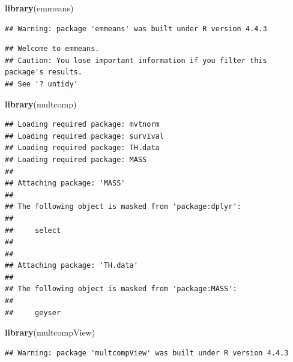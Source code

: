 \documentclass[
]{article}
\newenvironment{Shaded}{\begin{snugshade}}{\end{snugshade}}
\newcommand{\FunctionTok}[1]{\textcolor[rgb]{0.13,0.29,0.53}{\textbf{#1}}}
\newcommand{\NormalTok}[1]{#1}
\newcommand{\OtherTok}[1]{\textcolor[rgb]{0.56,0.35,0.01}{#1}}
\newcommand{\SpecialCharTok}[1]{\textcolor[rgb]{0.81,0.36,0.00}{\textbf{#1}}}
\begin{document}
\begin{Shaded}
\begin{Highlighting}[]
\FunctionTok{library}\NormalTok{(emmeans)}
\end{Highlighting}
\end{Shaded}

\begin{verbatim}
## Warning: package 'emmeans' was built under R version 4.4.3
\end{verbatim}

\begin{verbatim}
## Welcome to emmeans.
## Caution: You lose important information if you filter this package's results.
## See '? untidy'
\end{verbatim}

\begin{Shaded}
\begin{Highlighting}[]
\FunctionTok{library}\NormalTok{(multcomp)}
\end{Highlighting}
\end{Shaded}

\begin{verbatim}
## Loading required package: mvtnorm
## Loading required package: survival
## Loading required package: TH.data
## Loading required package: MASS
## 
## Attaching package: 'MASS'
## 
## The following object is masked from 'package:dplyr':
## 
##     select
## 
## 
## Attaching package: 'TH.data'
## 
## The following object is masked from 'package:MASS':
## 
##     geyser
\end{verbatim}

\begin{Shaded}
\begin{Highlighting}[]
\FunctionTok{library}\NormalTok{(multcompView)}
\end{Highlighting}
\end{Shaded}

\begin{verbatim}
## Warning: package 'multcompView' was built under R version 4.4.3
\end{verbatim}

\begin{Shaded}
\end{Shaded}
\end{document}
